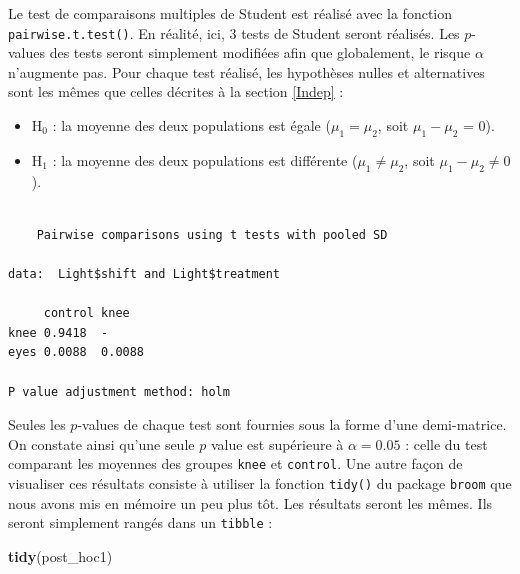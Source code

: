 \documentclass[
  a4paper,
]{article}
\newenvironment{Shaded}{\begin{snugshade}}{\end{snugshade}}
\newcommand{\CommentTok}[1]{\textcolor[rgb]{0.54,0.53,0.53}{#1}}
\newcommand{\KeywordTok}[1]{\textcolor[rgb]{0.12,0.11,0.11}{\textbf{#1}}}
\newcommand{\NormalTok}[1]{\textcolor[rgb]{0.12,0.11,0.11}{#1}}
\newcommand{\OperatorTok}[1]{\textcolor[rgb]{0.12,0.11,0.11}{#1}}
\newcommand{\StringTok}[1]{\textcolor[rgb]{0.75,0.01,0.01}{#1}}
\providecommand{\tightlist}{%
  \setlength{\itemsep}{0pt}\setlength{\parskip}{0pt}}
\begin{document}
Le test de comparaisons multiples de Student est réalisé avec la fonction \texttt{pairwise.t.test()}. En réalité, ici, 3 tests de Student seront réalisés. Les \(p\)-values des tests seront simplement modifiées afin que globalement, le risque \(\alpha\) n'augmente pas. Pour chaque test réalisé, les hypothèses nulles et alternatives sont les mêmes que celles décrites à la section \ref{Indep} :

\begin{itemize}
\tightlist
\item
  H\(_0\) : la moyenne des deux populations est égale (\(\mu_1 = \mu_2\), soit \(\mu_1 - \mu_2\) = 0).
\item
  H\(_1\) : la moyenne des deux populations est différente (\(\mu_1 \neq \mu_2\), soit \(\mu_1 - \mu_2 \neq 0\)).
\end{itemize}

\begin{Shaded}
\end{Shaded}

\begin{verbatim}

    Pairwise comparisons using t tests with pooled SD 

data:  Light$shift and Light$treatment 

     control knee  
knee 0.9418  -     
eyes 0.0088  0.0088

P value adjustment method: holm 
\end{verbatim}

Seules les \(p\)-values de chaque test sont fournies sous la forme d'une demi-matrice. On constate ainsi qu'une seule \(p\) value est supérieure à \(\alpha = 0.05\) : celle du test comparant les moyennes des groupes \texttt{knee} et \texttt{control}. Une autre façon de visualiser ces résultats consiste à utiliser la fonction \texttt{tidy()} du package \texttt{broom} que nous avons mis en mémoire un peu plus tôt. Les résultats seront les mêmes. Ils seront simplement rangés dans un \texttt{tibble} :

\begin{Shaded}
\begin{Highlighting}[]
\KeywordTok{tidy}\NormalTok{(post_hoc1)}
\end{Highlighting}
\end{Shaded}
\end{document}
